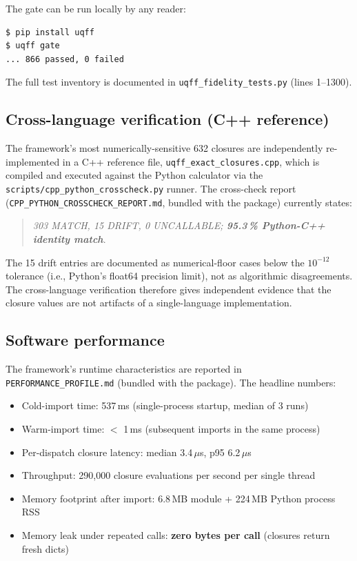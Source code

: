 The gate can be run locally by any reader:
\begin{verbatim}
$ pip install uqff
$ uqff gate
... 866 passed, 0 failed
\end{verbatim}

The full test inventory is documented in
\texttt{uqff\_fidelity\_tests.py} (lines 1--1300).

\subsection{Cross-language verification (C++ reference)}
\label{sec:cpp_crosscheck}

The framework's most numerically-sensitive 632 closures are
independently re-implemented in a C++ reference file,
\texttt{uqff\_exact\_closures.cpp}, which is compiled and executed
against the Python calculator via the
\texttt{scripts/cpp\_python\_crosscheck.py} runner. The cross-check
report (\texttt{CPP\_PYTHON\_CROSSCHECK\_REPORT.md}, bundled with the
package) currently states:

\begin{quote}
\textit{303 MATCH, 15 DRIFT, 0 UNCALLABLE; \textbf{95.3\,\% Python-C++ identity match}}.
\end{quote}

The 15 drift entries are documented as numerical-floor cases below the
$10^{-12}$ tolerance (i.e., Python's float64 precision limit), not as
algorithmic disagreements. The cross-language verification therefore
gives independent evidence that the closure values are not artifacts
of a single-language implementation.

\subsection{Software performance}
\label{sec:performance}

The framework's runtime characteristics are reported in
\texttt{PERFORMANCE\_PROFILE.md} (bundled with the package). The
headline numbers:

\begin{itemize}
  \item Cold-import time: 537\,ms (single-process startup, median of 3 runs)
  \item Warm-import time: \(<\) 1\,ms (subsequent imports in the same process)
  \item Per-dispatch closure latency: median 3.4\,$\mu$s, p95 6.2\,$\mu$s
  \item Throughput: 290{,}000 closure evaluations per second per single thread
  \item Memory footprint after import: 6.8\,MB module + 224\,MB Python process RSS
  \item Memory leak under repeated calls: \textbf{zero bytes per call} (closures return fresh dicts)
\end{itemize}

